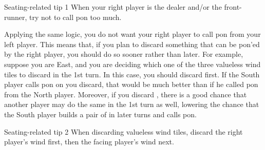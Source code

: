\bigskip
\begin{itembox}[c]{Seating-related tip 1}
When your right player is the dealer and/or the front-runner, try not to call {\jap pon} too much. 
\end{itembox}

\bigskip
Applying the same logic, you do not want your right player to call {\jap pon} from your left player. This means that, if you plan to discard something that can be {\jap pon}'ed by the right player, you should do so sooner rather than later. For example, suppose you are East, and you are deciding which one of the three valueless wind tiles {\LARGE\nan\xi\bei} to discard in the 1st turn. In this case, you should discard {\LARGE\nan} first. If the South player calls {\jap pon} on {\LARGE\nan} you discard, that would be much better than if he called {\jap pon} from the North player. Moreover, if you discard {\LARGE\nan}, there is a good chance that another player may do the same in the 1st turn as well, lowering the chance that the South player builds a pair of {\LARGE\nan} in later turns and calls {\jap pon}. 

\bigskip
\begin{itembox}[c]{Seating-related tip 2}
When discarding valueless wind tiles, discard the right player's wind first, then the facing player's wind next.
\end{itembox}



